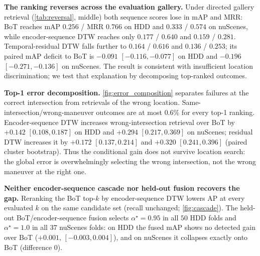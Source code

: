 \documentclass[runningheads]{llncs}
\begin{document}
\textbf{The ranking reverses across the evaluation gallery.} Under directed gallery retrieval
(\cref{tab:reversal}, middle) both sequence scores lose in mAP and MRR: BoT reaches mAP $0.256$ /
MRR $0.766$ on HDD and $0.333$ / $0.574$ on nuScenes, while encoder-sequence DTW reaches only
$0.177$ / $0.640$ and $0.159$ / $0.281$. Temporal-residual DTW falls further to $0.164$ / $0.616$
and $0.136$ / $0.253$; its paired mAP deficit to BoT is $-0.091$ $[-0.116, -0.077]$ on HDD and
$-0.196$ $[-0.271, -0.136]$ on nuScenes. The result is consistent with insufficient location
discrimination; we test that explanation by decomposing top-ranked outcomes.

\textbf{Top-1 error decomposition.} \cref{fig:error_composition} separates failures at the
correct intersection from retrievals of the wrong location. Same-intersection/wrong-maneuver
outcomes are at most $0.6\%$ for every top-1 ranking. Encoder-sequence DTW increases wrong-intersection
retrieval over BoT by $+0.142$ $[0.108, 0.187]$ on HDD and $+0.294$ $[0.217, 0.369]$ on
nuScenes; residual DTW increases it by $+0.172$ $[0.137, 0.214]$ and $+0.320$ $[0.241, 0.396]$
(paired cluster bootstrap). Thus the conditional gain does not survive location search:
the global error is overwhelmingly selecting the wrong intersection, not the wrong maneuver at the
right one.

\textbf{Neither encoder-sequence cascade nor held-out fusion recovers the gap.} Reranking the BoT top-$k$ by encoder-sequence DTW
lowers AP at every evaluated $k$ on the same candidate set (recall unchanged; \cref{fig:cascade}).
The held-out BoT/encoder-sequence fusion selects $\alpha^\star{=}0.95$ in all $50$ HDD folds and
$\alpha^\star{=}1.0$ in all $37$ nuScenes folds: on HDD the fused mAP shows no detected gain over
BoT ($+0.001$, $[-0.003, 0.004]$), and on nuScenes it collapses exactly onto BoT (difference $0$).
\end{document}

